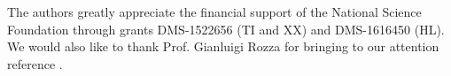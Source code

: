 \documentclass[11pt]{amsart}
\numberwithin{equation}{section}
\begin{document}
The authors greatly appreciate the financial support of the National Science Foundation through grants DMS-1522656 (TI and XX) and DMS-1616450 (HL). We would also like to thank Prof. Gianluigi Rozza for bringing to our attention reference \cite{Torlo16}.







%

\end{document}
